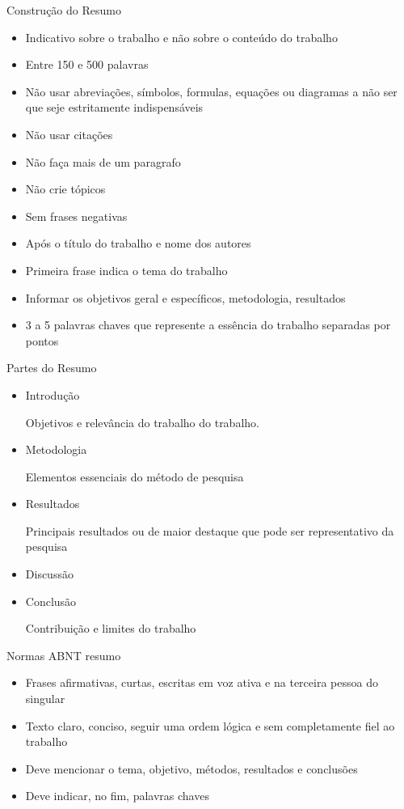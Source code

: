 \newpage
{\fontsize{17}{0}\selectfont Construção do Resumo}
\begin{itemize}
	\item Indicativo sobre o trabalho e não sobre o conteúdo do trabalho
	\item Entre 150 e 500 palavras
	\item Não usar abreviações, símbolos, formulas, equações ou diagramas a não ser que seje estritamente indispensáveis
	\item Não usar citações
	\item Não faça mais de um paragrafo
	\item Não crie tópicos
	\item Sem frases negativas
	\item Após o título do trabalho e nome dos autores
	\item Primeira frase indica o tema do trabalho
	\item Informar os objetivos geral e específicos, metodologia, resultados 
	\item 3 a 5 palavras chaves que represente a essência do trabalho separadas por pontos
\end{itemize}

{\fontsize{17}{0}\selectfont Partes do Resumo}
\begin{itemize}
	\item Introdução

		Objetivos e relevância do trabalho do trabalho. 
	\item Metodologia

		Elementos essenciais do método de pesquisa
	\item Resultados

		Principais resultados ou de maior destaque que pode ser representativo da pesquisa
	\item Discussão
	\item Conclusão

		Contribuição e limites do trabalho
\end{itemize}

{\fontsize{17}{0}\selectfont Normas ABNT resumo}
\begin{itemize}
	\item Frases afirmativas, curtas, escritas em voz ativa e na terceira pessoa do singular
	\item Texto claro, conciso, seguir uma ordem lógica e sem completamente fiel ao trabalho
	\item Deve mencionar o tema, objetivo, métodos, resultados e conclusões
	\item Deve indicar, no fim, palavras chaves
\end{itemize}
